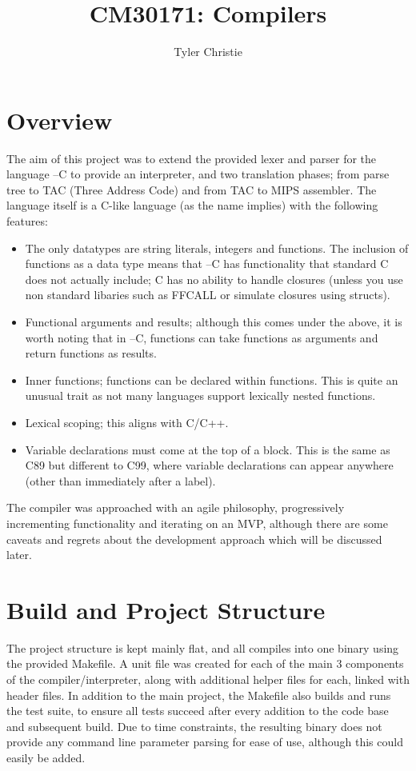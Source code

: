 \documentclass[12pt]{article}
\title{CM30171: Compilers}
\author{Tyler Christie}
\begin{document}
\maketitle
\section{Overview}
The aim of this project was to extend the provided lexer and parser for the language --C to provide an interpreter, and two translation phases; from parse tree to TAC (Three Address Code) and from TAC to MIPS assembler. The language itself is a C-like language (as the name implies) with the following features:
\begin{itemize}
    \item The only datatypes are string literals, integers and functions. The inclusion of functions as a data type means that --C has functionality that standard C does not actually include; C has no ability to handle closures (unless you use non standard libaries such as FFCALL or simulate closures using structs).
    \item Functional arguments and results; although this comes under the above, it is worth noting that in --C, functions can take functions as arguments and return functions as results.
    \item Inner functions; functions can be declared within functions. This is quite an unusual trait as not many languages support lexically nested functions.
    \item Lexical scoping; this aligns with C/C++.
    \item Variable declarations must come at the top of a block. This is the same as C89 but different to C99, where variable declarations can appear anywhere (other than immediately after a label).
\end{itemize}
The compiler was approached with an agile philosophy, progressively incrementing functionality and iterating on an MVP, although there are some caveats and regrets about the development approach which will be discussed later.
\section{Build and Project Structure}
The project structure is kept mainly flat, and all compiles into one binary using the provided Makefile. A unit file was created for each of the main 3 components of the compiler/interpreter, along with additional helper files for each, linked with header files. In addition to the main project, the Makefile also builds and runs the test suite, to ensure all tests succeed after every addition to the code base and subsequent build. Due to time constraints, the resulting binary does not provide any command line parameter parsing for ease of use, although this could easily be added.
\end{document}
